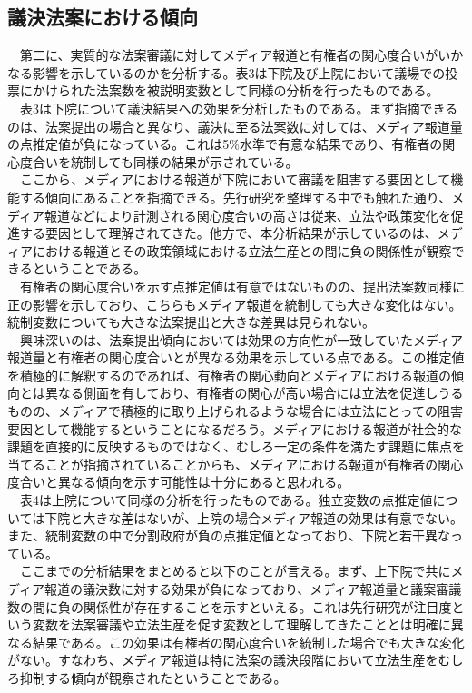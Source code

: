 \documentclass[here]{article}
\begin{document}
\subsection{議決法案における傾向}
　第二に、実質的な法案審議に対してメディア報道と有権者の関心度合いがいかなる影響を示しているのかを分析する。表3は下院及び上院において議場での投票にかけられた法案数を被説明変数として同様の分析を行ったものである。\\
　表3は下院について議決結果への効果を分析したものである。まず指摘できるのは、法案提出の場合と異なり、議決に至る法案数に対しては、メディア報道量の点推定値が負になっている。これは5\%水準で有意な結果であり、有権者の関心度合いを統制しても同様の結果が示されている。\\
　ここから、メディアにおける報道が下院において審議を阻害する要因として機能する傾向にあることを指摘できる。先行研究を整理する中でも触れた通り、メディア報道などにより計測される関心度合いの高さは従来、立法や政策変化を促進する要因として理解されてきた。他方で、本分析結果が示しているのは、メディアにおける報道とその政策領域における立法生産との間に負の関係性が観察できるということである。\\
　有権者の関心度合いを示す点推定値は有意ではないものの、提出法案数同様に正の影響を示しており、こちらもメディア報道を統制しても大きな変化はない。統制変数についても大きな法案提出と大きな差異は見られない。\\
　興味深いのは、法案提出傾向においては効果の方向性が一致していたメディア報道量と有権者の関心度合いとが異なる効果を示している点である。この推定値を積極的に解釈するのであれば、有権者の関心動向とメディアにおける報道の傾向とは異なる側面を有しており、有権者の関心が高い場合には立法を促進しうるものの、メディアで積極的に取り上げられるような場合には立法にとっての阻害要因として機能するということになるだろう。メディアにおける報道が社会的な課題を直接的に反映するものではなく、むしろ一定の条件を満たす課題に焦点を当てることが指摘されている\citep*{Boydstun2013-ph}ことからも、メディアにおける報道が有権者の関心度合いと異なる傾向を示す可能性は十分にあると思われる。\\
　表4は上院について同様の分析を行ったものである。独立変数の点推定値については下院と大きな差はないが、上院の場合メディア報道の効果は有意でない。また、統制変数の中で分割政府が負の点推定値となっており、下院と若干異なっている。\\
　ここまでの分析結果をまとめると以下のことが言える。まず、上下院で共にメディア報道の議決数に対する効果が負になっており、メディア報道量と議案審議数の間に負の関係性が存在することを示すといえる。これは先行研究が注目度という変数を法案審議や立法生産を促す変数として理解してきたこと\citep*{Binder2003-bn,Binder2017-wr,Adler2013-ay}とは明確に異なる結果である。この効果は有権者の関心度合いを統制した場合でも大きな変化がない。すなわち、メディア報道は特に法案の議決段階において立法生産をむしろ抑制する傾向が観察されたということである。\\
\end{document}
